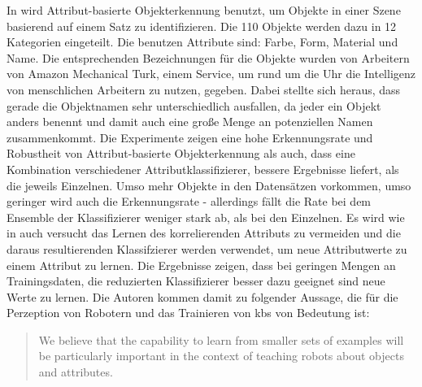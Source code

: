 In \cite{atrBasedObjIden} wird Attribut-basierte Objekterkennung benutzt, um Objekte in einer Szene basierend auf einem Satz zu identifizieren. Die 110 Objekte werden dazu in 12 Kategorien eingeteilt. Die benutzen Attribute sind: Farbe, Form, Material und Name. Die entsprechenden Bezeichnungen für die Objekte wurden von Arbeitern von Amazon Mechanical Turk, einem Service, um rund um die Uhr die Intelligenz von menschlichen Arbeitern zu nutzen, gegeben. Dabei stellte sich heraus, dass gerade die Objektnamen sehr unterschiedlich ausfallen, da jeder ein Objekt anders benennt und damit auch eine große Menge an potenziellen Namen zusammenkommt.  Die Experimente zeigen eine hohe Erkennungsrate und Robustheit von Attribut-basierte Objekterkennung als auch, dass eine Kombination verschiedener Attributklassifizierer, bessere Ergebnisse liefert, als die jeweils Einzelnen. Umso mehr Objekte in den Datensätzen vorkommen, umso geringer wird auch die Erkennungsrate - allerdings fällt die Rate bei dem Ensemble der Klassifizierer weniger stark ab, als bei den Einzelnen. Es wird wie in \cite{descObjbyAtr} auch versucht das Lernen des korrelierenden Attributs zu vermeiden und die daraus resultierenden Klassifzierer werden verwendet, um neue Attributwerte zu einem Attribut zu lernen. Die Ergebnisse zeigen, dass bei geringen Mengen an Trainingsdaten, die reduzierten Klassifizierer besser dazu geeignet sind neue Werte zu lernen. Die Autoren kommen damit zu folgender Aussage, die für die Perzeption von Robotern und das Trainieren von \glspl{kb} von Bedeutung ist: 
\begin{quote}
\glqq We believe that the capability to learn from smaller sets
of examples will be particularly important in the context of
teaching robots about objects and attributes.\grqq
\end{quote} \par

